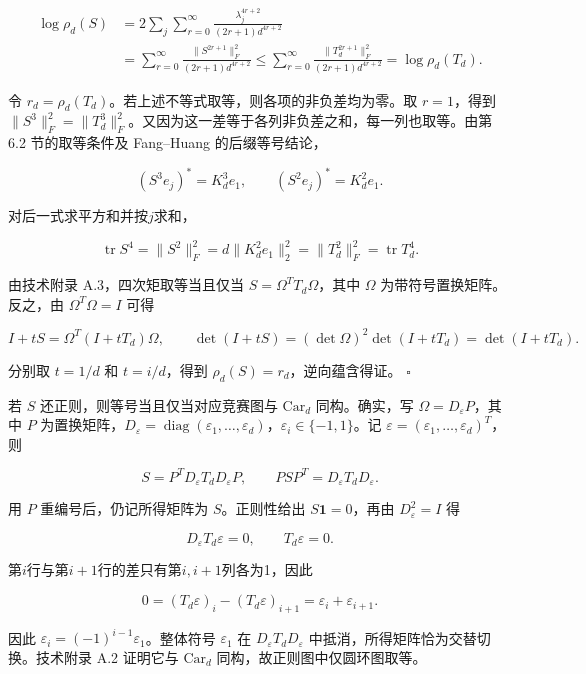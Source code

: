 \documentclass[11pt,a4paper]{article}
\begin{document}
\[
\begin{aligned}
\log\rho_d(S)
&=2\sum_j\sum_{r=0}^\infty
\frac{\lambda_j^{4r+2}}{(2r+1)d^{4r+2}}\\
&=\sum_{r=0}^\infty
\frac{\|S^{2r+1}\|_F^2}{(2r+1)d^{4r+2}}
\le\sum_{r=0}^\infty
\frac{\|T_d^{2r+1}\|_F^2}{(2r+1)d^{4r+2}}
=\log\rho_d(T_d).
\end{aligned}
\]

令 \(r_d=\rho_d(T_d)\)。若上述不等式取等，则各项的非负差均为零。取 \(r=1\)，得到 \(\|S^3\|_F^2=\|T_d^3\|_F^2\)。又因为这一差等于各列非负差之和，每一列也取等。由第 6.2 节的取等条件及 Fang--Huang 的后缀等号结论，

\[
(S^3e_j)^*=K_d^3e_1,\qquad
(S^2e_j)^*=K_d^2e_1.
\]

对后一式求平方和并按\(j\)求和，

\[
\operatorname{tr}S^4=\|S^2\|_F^2
=d\|K_d^2e_1\|_2^2
=\|T_d^2\|_F^2=\operatorname{tr}T_d^4.
\]

由技术附录 A.3，四次矩取等当且仅当 \(S=\Omega^TT_d\Omega\)，其中 \(\Omega\) 为带符号置换矩阵。反之，由 \(\Omega^T\Omega=I\) 可得

\[
I+tS=\Omega^T(I+tT_d)\Omega,\qquad
\det(I+tS)=(\det \Omega)^2\det(I+tT_d)=\det(I+tT_d).
\]

分别取 \(t=1/d\) 和 \(t=i/d\)，得到 \(\rho_d(S)=r_d\)，逆向蕴含得证。 \(\square\)

若 \(S\) 还正则，则等号当且仅当对应竞赛图与 \(\mathrm{Car}_d\) 同构。确实，写 \(\Omega=D_{\varepsilon}P\)，其中 \(P\) 为置换矩阵，\(D_{\varepsilon}=\operatorname{diag}(\varepsilon_1,\ldots,\varepsilon_d)\)，\(\varepsilon_i\in\{-1,1\}\)。记 \(\varepsilon=(\varepsilon_1,\ldots,\varepsilon_d)^T\)，则

\[
S=P^TD_{\varepsilon}T_dD_{\varepsilon}P,\qquad PSP^T=D_{\varepsilon}T_dD_{\varepsilon}.
\]

用 \(P\) 重编号后，仍记所得矩阵为 \(S\)。正则性给出 \(S\mathbf1=0\)，再由 \(D_{\varepsilon}^2=I\) 得

\[
D_{\varepsilon}T_d\varepsilon=0,\qquad T_d\varepsilon=0.
\]

第\(i\)行与第\(i+1\)行的差只有第\(i,i+1\)列各为1，因此

\[
0=(T_d\varepsilon)_i-(T_d\varepsilon)_{i+1}=\varepsilon_i+\varepsilon_{i+1}.
\]

因此 \(\varepsilon_i=(-1)^{i-1}\varepsilon_1\)。整体符号 \(\varepsilon_1\) 在 \(D_{\varepsilon}T_dD_{\varepsilon}\) 中抵消，所得矩阵恰为交替切换。技术附录 A.2 证明它与 \(\mathrm{Car}_d\) 同构，故正则图中仅圆环图取等。
\end{document}
